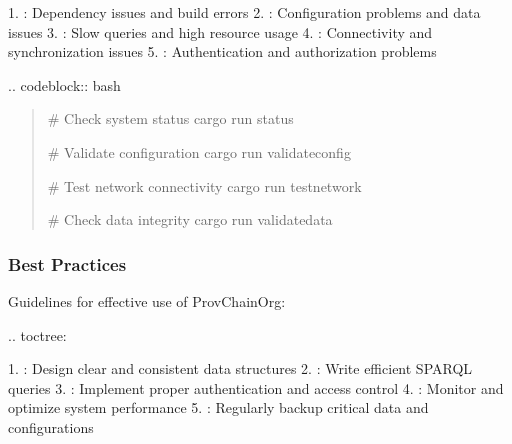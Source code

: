 \documentclass[letterpaper,10pt,english]{sphinxmanual}
\begin{document}
\sphinxAtStartPar
{}
1. : Dependency issues and build errors
2. : Configuration problems and data issues
3. : Slow queries and high resource usage
4. : Connectivity and synchronization issues
5. : Authentication and authorization problems

\sphinxAtStartPar
{}
.. code\sphinxhyphen{}block:: bash
\begin{quote}

\sphinxAtStartPar
\# Check system status
cargo run \textendash{} status

\sphinxAtStartPar
\# Validate configuration
cargo run \textendash{} validate\sphinxhyphen{}config

\sphinxAtStartPar
\# Test network connectivity
cargo run \textendash{} test\sphinxhyphen{}network

\sphinxAtStartPar
\# Check data integrity
cargo run \textendash{} validate\sphinxhyphen{}data
\end{quote}


\subsubsection{Best Practices}
\label{\detokenize{user-guide/index:best-practices}}
\sphinxAtStartPar
Guidelines for effective use of ProvChainOrg:

\sphinxAtStartPar
{}
.. toctree:

\begin{sphinxVerbatim}[commandchars=\\\{\}]
 
  

\end{sphinxVerbatim}

\sphinxAtStartPar
{}
1. : Design clear and consistent data structures
2. : Write efficient SPARQL queries
3. : Implement proper authentication and access control
4. : Monitor and optimize system performance
5. : Regularly backup critical data and configurations
\end{document}
